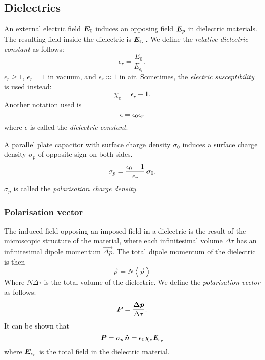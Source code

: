 \subsection{Dielectrics}    
    An external electric field $\bm{E}_0$ induces an opposing field $\bm{E}_p$ in dielectric materials. 
    The resulting field inside the dielectric is $\bm{E}_{\epsilon_r}$. We define the \textit{relative dielectric constant} as follows: 
    \begin{equation}
        \epsilon_r = \frac{E_0}{E_{\epsilon_r}}.
    \end{equation}
    $\epsilon_r \geq 1$,  $\epsilon_r = 1$ in vacuum, and $\epsilon_r \approx 1$ in air.
    Sometimes, the \textit{electric susceptibility} is used instead:
    \begin{equation}
        \chi_e = \epsilon_r -1.
    \end{equation}
    Another notation used is 
    \begin{equation}
        \epsilon = \epsilon_0\epsilon_r
    \end{equation}
    where $\epsilon$ is called the \textit{dielectric constant}.
    
    A parallel plate capacitor with surface charge density $\sigma_0$ induces a surface charge density $\sigma_p$ of opposite sign on both sides. 
    \begin{equation}
        \sigma_p = \frac{\epsilon_0 -1}{\epsilon_r}\,\sigma_0.
    \end{equation}
    $\sigma_p$ is called the \textit{polarisation charge density}.
    
    \subsubsection{Polarisation vector}
        The induced field opposing an imposed field in a dielectric is the result of the microscopic structure of the material, 
        where each infinitesimal volume $\Delta \tau$ has an infinitesimal dipole momentum $\vec{\Delta p}$. 
        The total dipole momentum of the dielectric is then 
        \begin{equation}
            \vec{p} = N\left< \vec{p} \right>
        \end{equation}
        Where $N\Delta \tau$ is the total volume of the dielectric. We define the \textit{polarisation vector} as follows:
        \begin{equation}
            \bm{P} = \frac{\bm{\Delta p}}{\Delta \tau}.
        \end{equation}
        It can be shown that 
        \begin{equation}
            \p = \sigma_p\,\hat{n} = \e \chi_e \E_{\epsilon_r}
        \end{equation}
        where $\bm{E}_{\epsilon_r}$ is the total field in the dielectric material.
        
